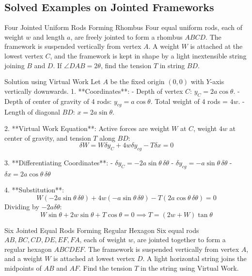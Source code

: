 \documentclass[11pt,a4paper]{article}
\begin{document}
\subsection{Solved Examples on Jointed Frameworks}

\begin{examplebox}{Four Jointed Uniform Rods Forming Rhombus}
Four equal uniform rods, each of weight $w$ and length $a$, are freely jointed to form a rhombus $ABCD$. The framework is suspended vertically from vertex $A$. A weight $W$ is attached at the lowest vertex $C$, and the framework is kept in shape by a light inextensible string joining $B$ and $D$. If $\angle DAB = 2\theta$, find the tension $T$ in string $BD$.
\end{examplebox}

\begin{proofbox}{Solution using Virtual Work}
Let $A$ be the fixed origin $(0,0)$ with $Y$-axis vertically downwards.
1. **Coordinates**:
   - Depth of vertex $C$: $y_C = 2a\cos\theta$.
   - Depth of center of gravity of 4 rods: $y_{cg} = a\cos\theta$. Total weight of 4 rods = $4w$.
   - Length of diagonal $BD$: $x = 2a\sin\theta$.

2. **Virtual Work Equation**:
   Active forces are weight $W$ at $C$, weight $4w$ at center of gravity, and tension $T$ along $BD$:
   \begin{equation}
   \delta W = W \delta y_C + 4w \delta y_{cg} - T \delta x = 0
   \end{equation}

3. **Differentiating Coordinates**:
   - $\delta y_C = -2a\sin\theta \, \delta\theta$
   - $\delta y_{cg} = -a\sin\theta \, \delta\theta$
   - $\delta x = 2a\cos\theta \, \delta\theta$

4. **Substitution**:
   \[
   W(-2a\sin\theta \, \delta\theta) + 4w(-a\sin\theta \, \delta\theta) - T(2a\cos\theta \, \delta\theta) = 0
   \]
   Dividing by $-2a\delta\theta$:
   \[
   W\sin\theta + 2w\sin\theta + T\cos\theta = 0 \implies T = (2w + W) \tan\theta
   \]
\end{proofbox}

\begin{examplebox}{Six Jointed Equal Rods Forming Regular Hexagon}
Six equal rods $AB, BC, CD, DE, EF, FA$, each of weight $w$, are jointed together to form a regular hexagon $ABCDEF$. The framework is suspended vertically from vertex $A$, and a weight $W$ is attached at lowest vertex $D$. A light horizontal string joins the midpoints of $AB$ and $AF$. Find the tension $T$ in the string using Virtual Work.
\end{examplebox}
\end{document}
